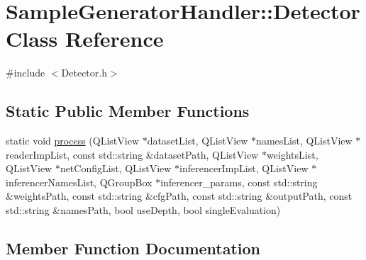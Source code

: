 \hypertarget{class_sample_generator_handler_1_1_detector}{}\section{Sample\+Generator\+Handler\+:\+:Detector Class Reference}
\label{class_sample_generator_handler_1_1_detector}


{\ttfamily \#include $<$Detector.\+h$>$}

\subsection*{Static Public Member Functions}
\begin{DoxyCompactItemize}
\item 
static void \hyperlink{class_sample_generator_handler_1_1_detector_a9444b20f47b9b07fa4800bc283ab5c8a}{process} (Q\+List\+View $\ast$dataset\+List, Q\+List\+View $\ast$names\+List, Q\+List\+View $\ast$reader\+Imp\+List, const std\+::string \&dataset\+Path, Q\+List\+View $\ast$weights\+List, Q\+List\+View $\ast$net\+Config\+List, Q\+List\+View $\ast$inferencer\+Imp\+List, Q\+List\+View $\ast$inferencer\+Names\+List, Q\+Group\+Box $\ast$inferencer\+\_\+params, const std\+::string \&weights\+Path, const std\+::string \&cfg\+Path, const std\+::string \&output\+Path, const std\+::string \&names\+Path, bool use\+Depth, bool single\+Evaluation)
\end{DoxyCompactItemize}


\subsection{Member Function Documentation}
\mbox{\label{class_sample_generator_handler_1_1_detector_a9444b20f47b9b07fa4800bc283ab5c8a}} 
